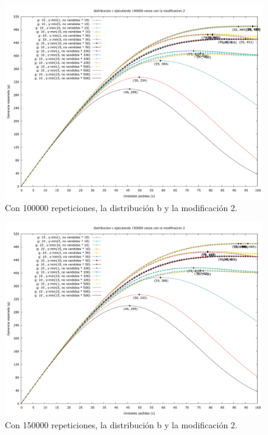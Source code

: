 \documentclass[12pt, spanish]{article}
\begin{document}
\begin{figure}[H]
	\centering
	\includegraphics[scale = 0.2]{prob_c/datos_c_100000_2.png}
	\caption{Con 100000 repeticiones, la distribución b y la modificación 2.}
	\label{fig:ej1_a_100000}

\end{figure}

\begin{figure}[H]
	\centering
	\includegraphics[scale = 0.2]{prob_c/datos_c_150000_2.png}
	\caption{Con 150000 repeticiones, la distribución b y la modificación 2.}
	\label{fig:ej1_a_150000}

\end{figure}
\end{document}
